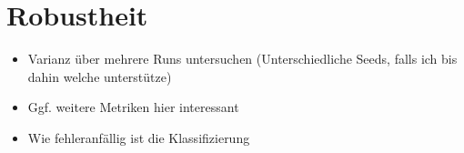 \section{Robustheit}\label{sec:robustheit}

\begin{itemize}
    \item Varianz über mehrere Runs untersuchen (Unterschiedliche Seeds, falls ich bis dahin welche unterstütze)
    \item Ggf. weitere Metriken hier interessant
    \item Wie fehleranfällig ist die Klassifizierung
\end{itemize}